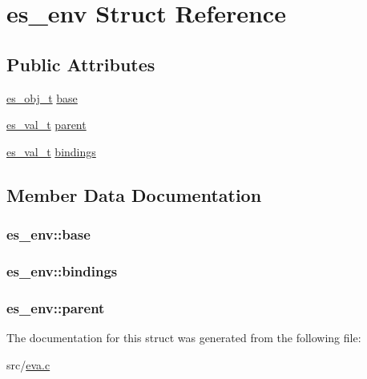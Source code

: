 \hypertarget{structes__env}{\section{es\-\_\-env Struct Reference}
\label{structes__env}
}
\subsection*{Public Attributes}
\begin{DoxyCompactItemize}
\item 
\hyperlink{eva_8h_a3370a89a85f5ff467ca5e7dba47e63bc}{es\-\_\-obj\-\_\-t} \hyperlink{structes__env_a07a74f457a43cbd058bdf849748bd815}{base}
\item 
\hyperlink{eva_8h_a31286b308f3660f383b567314be88045}{es\-\_\-val\-\_\-t} \hyperlink{structes__env_a696d7aca53cd133b88f3a13deb0bb620}{parent}
\item 
\hyperlink{eva_8h_a31286b308f3660f383b567314be88045}{es\-\_\-val\-\_\-t} \hyperlink{structes__env_adffdec4273815158ad77f41e438688ca}{bindings}
\end{DoxyCompactItemize}


\subsection{Member Data Documentation}
\hypertarget{structes__env_a07a74f457a43cbd058bdf849748bd815}{
\subsubsection[{base}]{ es\-\_\-env\-::base}}\label{structes__env_a07a74f457a43cbd058bdf849748bd815}
\hypertarget{structes__env_adffdec4273815158ad77f41e438688ca}{
\subsubsection[{bindings}]{ es\-\_\-env\-::bindings}}\label{structes__env_adffdec4273815158ad77f41e438688ca}
\hypertarget{structes__env_a696d7aca53cd133b88f3a13deb0bb620}{
\subsubsection[{parent}]{ es\-\_\-env\-::parent}}\label{structes__env_a696d7aca53cd133b88f3a13deb0bb620}


The documentation for this struct was generated from the following file\-:\begin{DoxyCompactItemize}
\item 
src/\hyperlink{eva_8c}{eva.\-c}\end{DoxyCompactItemize}
